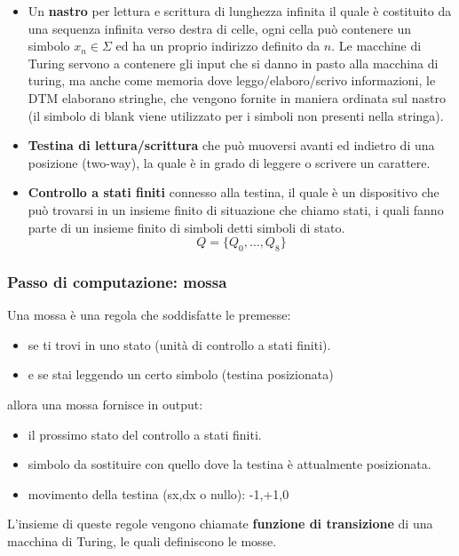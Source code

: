 \documentclass{article}
\begin{document}
\begin{itemize}
    \item Un \textbf{nastro} per lettura e scrittura di lunghezza infinita il quale è costituito
          da una sequenza infinita verso destra di celle, ogni cella può contenere un simbolo $x_n\in\Sigma$ ed
          ha un proprio indirizzo definito da $n$. Le macchine di Turing servono a contenere gli input
          che si danno in pasto alla macchina di turing, ma anche come memoria dove leggo/elaboro/scrivo
          informazioni, le DTM elaborano stringhe, che vengono fornite in maniera ordinata
          sul nastro (il simbolo di blank viene utilizzato per i simboli non presenti nella stringa).

    \item \textbf{Testina di lettura/scrittura} che può muoversi avanti ed indietro di una posizione (two-way),
          la quale è in grado di leggere o scrivere un carattere.
    \item \textbf{Controllo a stati finiti} connesso alla testina, il quale è un dispositivo che può trovarsi
          in un insieme finito di situazione che chiamo stati, i quali fanno parte di un insieme finito di simboli
          detti simboli di stato.
          $$Q=\{Q_0,\dots,Q_8\}$$
\end{itemize}

\subsubsection{Passo di computazione: mossa}
Una mossa è una regola che soddisfatte le premesse:
\begin{itemize}
    \item se ti trovi in uno stato (unità di
          controllo a stati finiti).
    \item e se stai leggendo un
          certo simbolo (testina posizionata)
\end{itemize}
allora una mossa fornisce in output:
\begin{itemize}
    \item il prossimo stato del controllo a stati finiti.
    \item simbolo da sostituire con quello dove la testina è attualmente posizionata.
    \item movimento della testina (sx,dx o nullo): -1,+1,0
\end{itemize}
L'insieme di queste regole vengono chiamate \textbf{funzione di transizione} di una
macchina di Turing, le quali definiscono le mosse.
\end{document}
